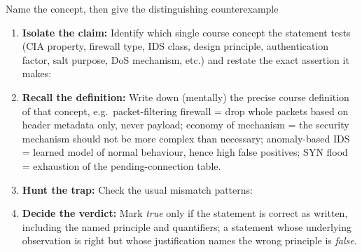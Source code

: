 \documentclass[12pt, a4paper]{article}
\newcommand{\term}[1]{\textbf{\textit{#1}}}        %
\begin{document}
\begin{schemebox}{Name the concept, then give the distinguishing counterexample}
\begin{enumerate}[label=\textbf{Step \arabic*:}, leftmargin=*]
    \item \textbf{Isolate the claim:} Identify which single course concept the statement tests (CIA property, firewall type, IDS class, design principle, authentication factor, salt purpose, DoS mechanism, etc.) and restate the exact assertion it makes:
    \item \textbf{Recall the definition:} Write down (mentally) the precise course definition of that concept, e.g.\ packet-filtering firewall = drop whole packets based on header metadata only, never payload; economy of mechanism = the security mechanism should not be more complex than necessary;
    anomaly-based IDS = learned model of normal behaviour, hence high false positives; SYN flood = exhaustion of the pending-connection table.
    \item \textbf{Hunt the trap:} Check the usual mismatch patterns:
    \item \textbf{Decide the verdict:} Mark \emph{true} only if the statement is correct as written, including the named principle and quantifiers; a statement whose underlying observation is right but whose justification names the wrong principle is \emph{false}.

\end{enumerate}
\end{schemebox}
\end{document}
